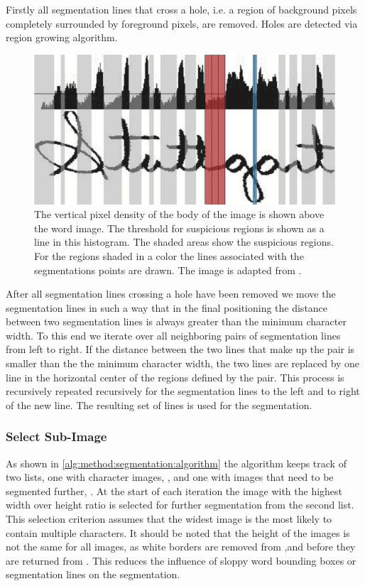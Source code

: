 	Firstly all segmentation lines that cross a hole, i.e. a region of background pixels completely surrounded by foreground pixels, are removed. Holes are detected via region growing algorithm. 
%
	\begin{figure}[!]
		\centering
		\includegraphics[width=0.8\columnwidth]{shared/img/method/suspicious_regions.png}
		\caption{The vertical pixel density of the body of the image is shown above the word image. The threshold for suspicious regions is shown as a line in this histogram. The shaded areas show the suspicious regions. For the regions shaded in a color the lines associated with the segmentations points are drawn. The image is adapted from \cite{lee2012binary}.}
		\label{fig:method:segmentation:suspiciousRegions}
	\end{figure}
%
	After all segmentation lines crossing a hole have been removed we move the segmentation lines in such a way that in the final positioning the distance between two segmentation lines is always greater than the minimum character width. To this end we iterate over all neighboring pairs of segmentation lines from left to right. If the distance between the two lines that make up the pair is smaller than the the minimum character width, the two lines are replaced by one line in the horizontal center of the regions defined by the pair.  This process is recursively repeated recursively for the segmentation lines to the left and to right of the new line. The resulting set of lines is used for the segmentation.

\subsubsection{Select Sub-Image}
\label{sss:method:segmentaton:selectsubimage}
	As shown in \cref{alg:method:segmentation:algorithm} the algorithm keeps track of two lists, one with character images, \characters, and one with images that need to be segmented further, \segmentfurther. At the start of each iteration the image with the highest width over height ratio is selected for further segmentation from the second list. This selection criterion assumes that the widest image is the most likely to contain multiple characters. It should be noted that the height of the images is not the same for all images, as white borders are removed from \image,\leftsubimage and \rightsubimage before they are returned from . This reduces the influence of sloppy word bounding boxes or segmentation lines on the segmentation.

